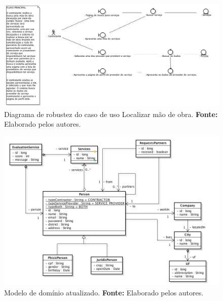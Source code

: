 \begin{figure}[h!]
	\centerline{\includegraphics[scale=0.35]{./imagens/robustez.png}}
	\caption[Diagrama de robustez do caso de uso Localizar mão de obra]
	{Diagrama de robustez do caso de uso Localizar mão de obra. \textbf{Fonte:} Elaborado pelos autores.}
	\label{fig:exemplo1}
\end{figure}

\begin{figure}[h!]
	\centerline{\includegraphics[scale=0.6]{./imagens/modelo-dominio-com-atributos.png}}
	\caption[Modelo de domínio atualizado]
	{Modelo de domínio atualizado. \textbf{Fonte:} Elaborado pelos autores.}
	\label{fig:exemplo1}
\end{figure} 

